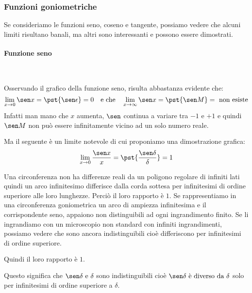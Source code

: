 \subsubsection{Funzioni goniometriche}

Se consideriamo le funzioni seno, coseno e tangente, possiamo vedere che 
alcuni limiti risultano banali, ma altri sono interessanti e possono essere 
dimostrati.

\begin{minipage}{.66\textwidth}
\begin{center} \sinusoide \end{center}
\begin{center} \cosinusoide \end{center}
\end{minipage}
\hfill
\begin{minipage}{.33\textwidth}
\begin{center} \tangentoide \end{center}
\end{minipage}

\paragraph{Funzione seno}~

Osservando il grafico della funzione seno, risulta abbastanza evidente che:
\[\lim_{x \rightarrow 0}{\sen x} = \pst{\sen \epsilon} = 0
\quad \text{e che} \quad 
\lim_{x \rightarrow \infty}{\sen x} = \pst{\sen M} = \text{ non esiste}\]
Infatti man mano che \(x\) aumenta, \(\sen \)
continua a variare tra \(-1\) e \(+1\) e quindi 
\(\sen M\) non può essere infinitamente vicino ad un solo numero reale.

Ma il seguente è un limite notevole di cui proponiamo una dimostrazione 
grafica:
\[\lim_{x \rightarrow 0}\frac{\sen x}{x} = 
  \pst{\frac{\sen \delta}{\delta}} = 1\]
\begin{minipage}{.49\textwidth}
Una circonferenza non ha differenze reali da un poligono regolare di 
infiniti lati quindi un arco infinitesimo differisce dalla corda 
sottesa per infinitesimi di ordine superiore alle loro lunghezze. Perciò il 
loro rapporto è \(1\).
Se rappresentiamo in una circonferenza goniometrica un arco di ampiezza 
infinitesima e il corrispondente seno, appaiono non distinguibili ad ogni 
ingrandimento finito. Se li ingrandiamo con un microscopio non standard con 
infiniti ingrandimenti, possiamo vedere che sono ancora indistinguibili 
cioè differiscono per infinitesimi di ordine superiore. 

Quindi il loro rapporto è \(1\).
\end{minipage}
\hfill
\begin{minipage}{.49\textwidth}
\begin{center} \limiteseno \end{center}
\end{minipage}
Questo significa che \(\sen \delta \text{ e } \delta\) sono indistinguibili 
cioè \(\sen \delta \text{ è diverso da } \delta\) solo per infinitesimi di 
ordine superiore a \(\delta\).

